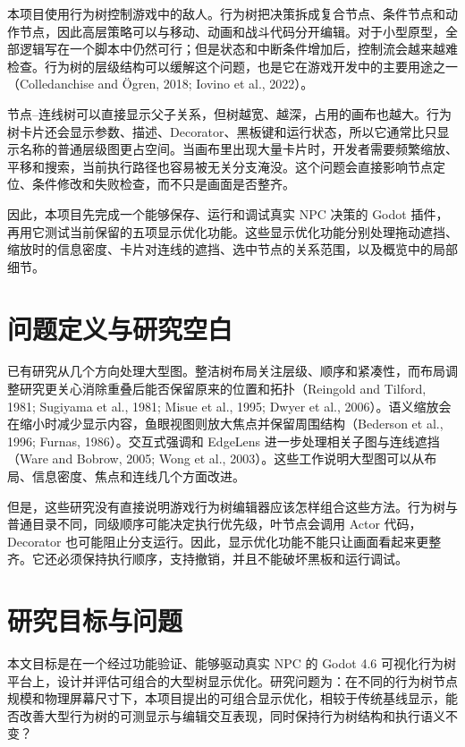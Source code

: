 \documentclass[11pt,a4paper,oneside,extrafontsizes]{memoir}
\begin{document}
本项目使用行为树控制游戏中的敌人。行为树把决策拆成复合节点、条件节点和动作节点，因此高层策略可以与移动、动画和战斗代码分开编辑。对于小型原型，全部逻辑写在一个脚本中仍然可行；但是状态和中断条件增加后，控制流会越来越难检查。行为树的层级结构可以缓解这个问题，也是它在游戏开发中的主要用途之一（Colledanchise and Ögren, 2018; Iovino et al., 2022）。

节点–连线树可以直接显示父子关系，但树越宽、越深，占用的画布也越大。行为树卡片还会显示参数、描述、Decorator、黑板键和运行状态，所以它通常比只显示名称的普通层级图更占空间。当画布里出现大量卡片时，开发者需要频繁缩放、平移和搜索，当前执行路径也容易被无关分支淹没。这个问题会直接影响节点定位、条件修改和失败检查，而不只是画面是否整齐。

因此，本项目先完成一个能够保存、运行和调试真实 NPC 决策的 Godot 插件，再用它测试当前保留的五项显示优化功能。这些显示优化功能分别处理拖动遮挡、缩放时的信息密度、卡片对连线的遮挡、选中节点的关系范围，以及概览中的局部细节。

\section{问题定义与研究空白}

已有研究从几个方向处理大型图。整洁树布局关注层级、顺序和紧凑性，而布局调整研究更关心消除重叠后能否保留原来的位置和拓扑（Reingold and Tilford, 1981; Sugiyama et al., 1981; Misue et al., 1995; Dwyer et al., 2006）。语义缩放会在缩小时减少显示内容，鱼眼视图则放大焦点并保留周围结构（Bederson et al., 1996; Furnas, 1986）。交互式强调和 EdgeLens 进一步处理相关子图与连线遮挡（Ware and Bobrow, 2005; Wong et al., 2003）。这些工作说明大型图可以从布局、信息密度、焦点和连线几个方面改进。

但是，这些研究没有直接说明游戏行为树编辑器应该怎样组合这些方法。行为树与普通目录不同，同级顺序可能决定执行优先级，叶节点会调用 Actor 代码，Decorator 也可能阻止分支运行。因此，显示优化功能不能只让画面看起来更整齐。它还必须保持执行顺序，支持撤销，并且不能破坏黑板和运行调试。

\section{研究目标与问题}

本文目标是在一个经过功能验证、能够驱动真实 NPC 的 Godot 4.6 可视化行为树平台上，设计并评估可组合的大型树显示优化。研究问题为：在不同的行为树节点规模和物理屏幕尺寸下，本项目提出的可组合显示优化，相较于传统基线显示，能否改善大型行为树的可测显示与编辑交互表现，同时保持行为树结构和执行语义不变？
\end{document}
